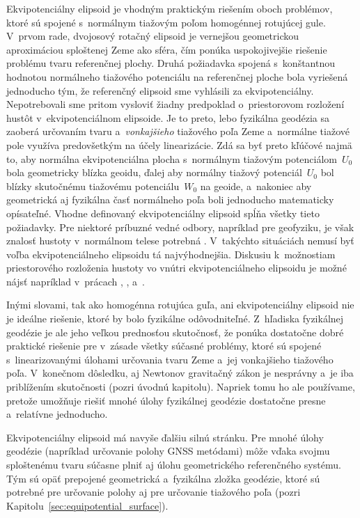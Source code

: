 \documentclass[a4paper, 12pt]{book}
\begin{document}
Ekvipotenciálny elipsoid je vhodným praktickým riešením oboch problémov, ktoré 
sú spojené s~normálnym tiažovým poľom homogénnej rotujúcej gule.  V~prvom rade, 
dvojosový rotačný elipsoid je vernejšou geometrickou aproximáciou sploštenej 
Zeme ako sféra, čím ponúka uspokojivejšie riešenie problému tvaru referenčnej 
plochy.  Druhá požiadavka spojená s~konštantnou hodnotou normálneho tiažového 
potenciálu na referenčnej ploche bola vyriešená jednoducho tým, že referenčný 
elipsoid sme vyhlásili za ekvipotenciálny.  Nepotrebovali sme pritom vysloviť 
žiadny predpoklad o~priestorovom rozložení hustôt v~ekvipotenciálnom elipsoide.  
Je to preto, lebo fyzikálna geodézia sa zaoberá určovaním tvaru 
a~\emph{vonkajšieho} tiažového poľa Zeme a~normálne tiažové pole využíva 
predovšetkým na účely linearizácie.  Zdá sa byť preto kľúčové najmä to, aby 
normálna ekvipotenciálna plocha s~normálnym tiažovým potenciálom~$U_0$ bola 
geometricky blízka geoidu, ďalej aby normálny tiažový potenciál~$U_0$ bol 
blízky skutočnému tiažovému potenciálu~$W_0$ na geoide, a~nakoniec aby 
geometrická aj fyzikálna časť normálneho poľa boli jednoducho matematicky 
opísateľné.  Vhodne definovaný ekvipotenciálny elipsoid spĺňa všetky tieto 
požiadavky.  Pre niektoré príbuzné vedné odbory, napríklad pre geofyziku, je 
však znalosť hustoty v~normálnom telese potrebná \parencite{Karcol2017}.  
V~takýchto situáciách nemusí byť voľba ekvipotenciálneho elipsoidu tá 
najvýhodnejšia.  Diskusiu k~možnostiam priestorového rozloženia hustoty vo 
vnútri ekvipotenciálneho elipsoidu je možné nájsť napríklad v~prácach 
\textcite{MoritzTheFigureOfTheEarth}, \textcite{Conway2000}, 
\textcite{TorgeGeodesy} a~\textcite{Karcol2017}.

Inými slovami, tak ako homogénna rotujúca guľa, ani ekvipotenciálny elipsoid 
nie je ideálne riešenie, ktoré by bolo fyzikálne odôvodniteľné.  Z~hľadiska 
fyzikálnej geodézie je ale jeho veľkou prednosťou skutočnosť, že ponúka 
dostatočne dobré praktické riešenie pre v~zásade všetky súčasné problémy, ktoré 
sú spojené s~linearizovanými úlohami určovania tvaru Zeme a~jej vonkajšieho 
tiažového poľa.  V~konečnom dôsledku, aj Newtonov gravitačný zákon je nesprávny 
a~je iba priblížením skutočnosti (pozri úvodnú kapitolu).  Napriek tomu ho ale 
používame, pretože umožňuje riešiť mnohé úlohy fyzikálnej geodézie dostatočne 
presne a~relatívne jednoducho.

Ekvipotenciálny elipsoid má navyše ďalšiu silnú stránku.  Pre mnohé úlohy 
geodézie (napríklad určovanie polohy GNSS metódami) môže vďaka svojmu 
sploštenému tvaru súčasne plniť aj úlohu geometrického referenčného systému.  
Tým sú opäť prepojené geometrická a~fyzikálna zložka geodézie, ktoré sú 
potrebné pre určovanie polohy aj pre určovanie tiažového poľa (pozri 
Kapitolu~\ref{sec:equipotential_surface}).
\end{document}
